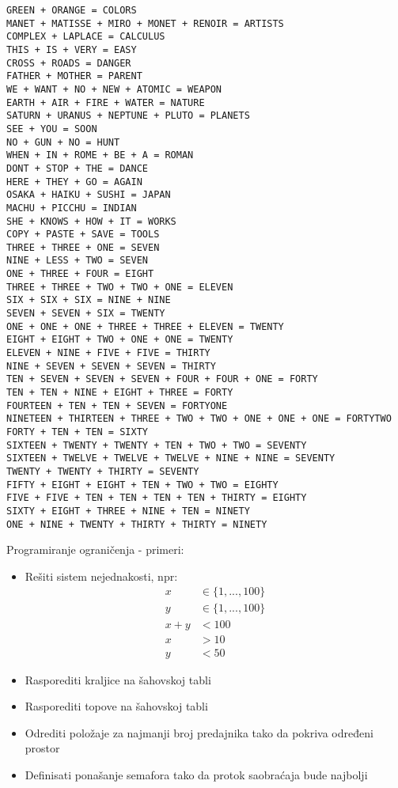 \documentclass[../main.tex]{subfiles}
\begin{document}
\begin{boxprimer}[breakable]
\begin{verbatim}
GREEN + ORANGE = COLORS
MANET + MATISSE + MIRO + MONET + RENOIR = ARTISTS
COMPLEX + LAPLACE = CALCULUS
THIS + IS + VERY = EASY
CROSS + ROADS = DANGER
FATHER + MOTHER = PARENT
WE + WANT + NO + NEW + ATOMIC = WEAPON
EARTH + AIR + FIRE + WATER = NATURE
SATURN + URANUS + NEPTUNE + PLUTO = PLANETS
SEE + YOU = SOON
NO + GUN + NO = HUNT
WHEN + IN + ROME + BE + A = ROMAN
DONT + STOP + THE = DANCE
HERE + THEY + GO = AGAIN
OSAKA + HAIKU + SUSHI = JAPAN
MACHU + PICCHU = INDIAN
SHE + KNOWS + HOW + IT = WORKS
COPY + PASTE + SAVE = TOOLS
THREE + THREE + ONE = SEVEN
NINE + LESS + TWO = SEVEN
ONE + THREE + FOUR = EIGHT
THREE + THREE + TWO + TWO + ONE = ELEVEN
SIX + SIX + SIX = NINE + NINE
SEVEN + SEVEN + SIX = TWENTY
ONE + ONE + ONE + THREE + THREE + ELEVEN = TWENTY
EIGHT + EIGHT + TWO + ONE + ONE = TWENTY
ELEVEN + NINE + FIVE + FIVE = THIRTY
NINE + SEVEN + SEVEN + SEVEN = THIRTY
TEN + SEVEN + SEVEN + SEVEN + FOUR + FOUR + ONE = FORTY
TEN + TEN + NINE + EIGHT + THREE = FORTY
FOURTEEN + TEN + TEN + SEVEN = FORTYONE
NINETEEN + THIRTEEN + THREE + TWO + TWO + ONE + ONE + ONE = FORTYTWO
FORTY + TEN + TEN = SIXTY
SIXTEEN + TWENTY + TWENTY + TEN + TWO + TWO = SEVENTY
SIXTEEN + TWELVE + TWELVE + TWELVE + NINE + NINE = SEVENTY
TWENTY + TWENTY + THIRTY = SEVENTY
FIFTY + EIGHT + EIGHT + TEN + TWO + TWO = EIGHTY
FIVE + FIVE + TEN + TEN + TEN + TEN + THIRTY = EIGHTY
SIXTY + EIGHT + THREE + NINE + TEN = NINETY
ONE + NINE + TWENTY + THIRTY + THIRTY = NINETY
\end{verbatim}
\end{boxprimer}

\begin{boxprimer}
\begin{multicols}{2}

Programiranje ograničenja - primeri:
\begin{itemize}
\item Rešiti sistem nejednakosti, npr:
		\begin{align*}
			x &\in \{1,...,100\} \\
			y &\in \{1,...,100\}\\
			x+y&<100\\
			x&>10\\
			y&<50 
		\end{align*}
	
	\columnbreak
	
	\item Rasporediti kraljice na šahovskoj tabli
	\item Rasporediti topove na šahovskoj tabli
	\item Odrediti položaje za najmanji broj predajnika tako da pokriva određeni prostor
	\item Definisati ponašanje semafora tako da protok saobraćaja bude najbolji
\end{itemize}

\end{multicols}
\end{boxprimer}
\end{document}
